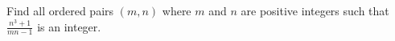 Find all ordered pairs $ (m,n)$ where $ m$ and $ n$ are positive integers such that $ \frac {n^3 + 1}{mn - 1}$ is an integer.